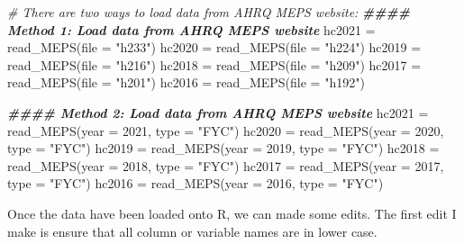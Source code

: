 \documentclass[
]{book}
\newenvironment{Shaded}{\begin{snugshade}}{\end{snugshade}}
\newcommand{\AttributeTok}[1]{\textcolor[rgb]{0.77,0.63,0.00}{#1}}
\newcommand{\CommentTok}[1]{\textcolor[rgb]{0.56,0.35,0.01}{\textit{#1}}}
\newcommand{\DecValTok}[1]{\textcolor[rgb]{0.00,0.00,0.81}{#1}}
\newcommand{\DocumentationTok}[1]{\textcolor[rgb]{0.56,0.35,0.01}{\textbf{\textit{#1}}}}
\newcommand{\FunctionTok}[1]{\textcolor[rgb]{0.00,0.00,0.00}{#1}}
\newcommand{\NormalTok}[1]{#1}
\newcommand{\OtherTok}[1]{\textcolor[rgb]{0.56,0.35,0.01}{#1}}
\newcommand{\StringTok}[1]{\textcolor[rgb]{0.31,0.60,0.02}{#1}}
\begin{document}
\begin{Shaded}
\begin{Highlighting}[]
\CommentTok{\# There are two ways to load data from AHRQ MEPS website:}
\DocumentationTok{\#\#\#\# Method 1: Load data from AHRQ MEPS website}
\NormalTok{hc2021 }\OtherTok{=} \FunctionTok{read\_MEPS}\NormalTok{(}\AttributeTok{file =} \StringTok{"h233"}\NormalTok{)}
\NormalTok{hc2020 }\OtherTok{=} \FunctionTok{read\_MEPS}\NormalTok{(}\AttributeTok{file =} \StringTok{"h224"}\NormalTok{)}
\NormalTok{hc2019 }\OtherTok{=} \FunctionTok{read\_MEPS}\NormalTok{(}\AttributeTok{file =} \StringTok{"h216"}\NormalTok{)}
\NormalTok{hc2018 }\OtherTok{=} \FunctionTok{read\_MEPS}\NormalTok{(}\AttributeTok{file =} \StringTok{"h209"}\NormalTok{)}
\NormalTok{hc2017 }\OtherTok{=} \FunctionTok{read\_MEPS}\NormalTok{(}\AttributeTok{file =} \StringTok{"h201"}\NormalTok{)}
\NormalTok{hc2016 }\OtherTok{=} \FunctionTok{read\_MEPS}\NormalTok{(}\AttributeTok{file =} \StringTok{"h192"}\NormalTok{)}


\DocumentationTok{\#\#\#\# Method 2: Load data from AHRQ MEPS website}
\NormalTok{hc2021 }\OtherTok{=} \FunctionTok{read\_MEPS}\NormalTok{(}\AttributeTok{year =} \DecValTok{2021}\NormalTok{, }\AttributeTok{type =} \StringTok{"FYC"}\NormalTok{)}
\NormalTok{hc2020 }\OtherTok{=} \FunctionTok{read\_MEPS}\NormalTok{(}\AttributeTok{year =} \DecValTok{2020}\NormalTok{, }\AttributeTok{type =} \StringTok{"FYC"}\NormalTok{)}
\NormalTok{hc2019 }\OtherTok{=} \FunctionTok{read\_MEPS}\NormalTok{(}\AttributeTok{year =} \DecValTok{2019}\NormalTok{, }\AttributeTok{type =} \StringTok{"FYC"}\NormalTok{)}
\NormalTok{hc2018 }\OtherTok{=} \FunctionTok{read\_MEPS}\NormalTok{(}\AttributeTok{year =} \DecValTok{2018}\NormalTok{, }\AttributeTok{type =} \StringTok{"FYC"}\NormalTok{)}
\NormalTok{hc2017 }\OtherTok{=} \FunctionTok{read\_MEPS}\NormalTok{(}\AttributeTok{year =} \DecValTok{2017}\NormalTok{, }\AttributeTok{type =} \StringTok{"FYC"}\NormalTok{)}
\NormalTok{hc2016 }\OtherTok{=} \FunctionTok{read\_MEPS}\NormalTok{(}\AttributeTok{year =} \DecValTok{2016}\NormalTok{, }\AttributeTok{type =} \StringTok{"FYC"}\NormalTok{)}
\end{Highlighting}
\end{Shaded}

Once the data have been loaded onto R, we can made some edits. The first edit I make is ensure that all column or variable names are in lower case.
\end{document}

